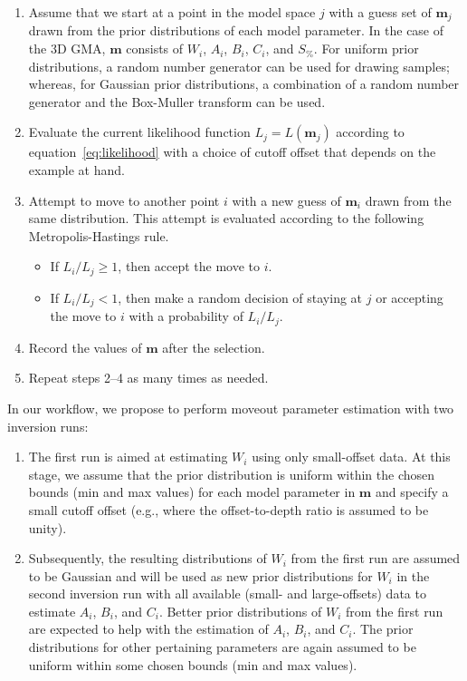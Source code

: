 \begin{enumerate}
    \item Assume that we start at a point in the model space $j$ with a guess set of $\mathbf{m}_j$ drawn from the prior distributions of each model parameter. In the case of the 3D GMA, $\mathbf{m}$ consists of $W_i$, $A_i$, $B_i$, $C_i$, and $S_{\%}$. For uniform prior distributions, a random number generator can be used for drawing samples; whereas, for Gaussian prior distributions, a combination of a random number generator and the Box-Muller transform can be used.
    
    \item Evaluate the current likelihood function $L_j = L(\mathbf{m}_j)$ according to equation~\ref{eq:likelihood} with a choice of cutoff offset that depends on the example at hand.
    
    \item Attempt to move to another point $i$ with a new guess of $\mathbf{m}_i$ drawn from the same distribution. This attempt is evaluated according to the following Metropolis-Hastings rule. 
    \begin{itemize}
        \item If $L_i/L_j \ge 1$, then accept the move to $i$.
        \item If $L_i/L_j < 1$, then make a random decision of staying at $j$ or accepting the move to $i$ with a probability of $L_i/L_j$.
    \end{itemize}
    
    \item Record the values of $\mathbf{m}$ after the selection.
    
    \item Repeat steps 2--4 as many times as needed.
    
\end{enumerate}

In our workflow, we propose to perform moveout parameter estimation with two inversion runs:
\begin{enumerate}
\item The first run is aimed at estimating $W_i$ using only small-offset data. At this stage, we assume that the prior distribution is uniform within the chosen bounds (min and max values) for each model parameter in $\mathbf{m}$ and specify a small cutoff offset (e.g., where the offset-to-depth ratio is assumed to be unity). 
\item Subsequently, the resulting distributions of $W_i$ from the first run are assumed to be Gaussian and will be used as new prior distributions for $W_i$ in the second inversion run with all available (small- and large-offsets) data to estimate $A_i$, $B_i$, and $C_i$. Better prior distributions of $W_i$ from the first run are expected to help with the estimation of $A_i$, $B_i$, and $C_i$. The prior distributions for other pertaining parameters are again assumed to be uniform within some chosen bounds (min and max values).
\end{enumerate}

